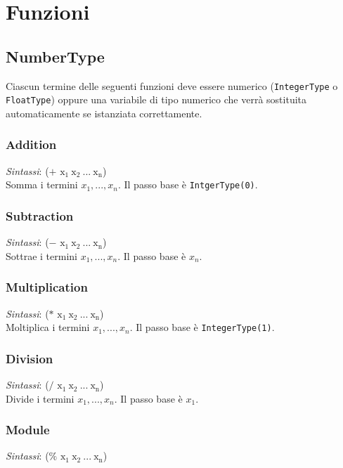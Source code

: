 \section{Funzioni}

\subsection{NumberType}

Ciascun termine delle seguenti funzioni deve essere numerico (\verb!IntegerType! o \verb!FloatType!) oppure una variabile di tipo numerico che verrà sostituita automaticamente se istanziata correttamente.

\subsubsection{Addition}
\emph{Sintassi}: ($+$ $\mathrm{x_1 \ x_2 \ ... \ x_n}$)\\

Somma i termini $x_1, ..., x_n$. Il passo base è \verb!IntgerType(0)!.


\subsubsection{Subtraction}
\emph{Sintassi}: ($-$ $\mathrm{x_1 \ x_2 \ ... \ x_n}$)\\

Sottrae i termini $x_1, ..., x_n$. Il passo base è $x_n$.


\subsubsection{Multiplication}
\emph{Sintassi}: ($*$ $ \mathrm{x_1 \ x_2 \ ... \ x_n}$)\\

Moltiplica i termini $x_1, ..., x_n$. Il passo base è \verb!IntegerType(1)!.


\subsubsection{Division}
\emph{Sintassi}: ($/$ $ \mathrm{x_1 \ x_2 \ ... \ x_n}$)\\

Divide i termini $x_1, ..., x_n$. Il passo base è $x_1$.


\subsubsection{Module}
\emph{Sintassi}: ($\%$ $ \mathrm{x_1 \ x_2 \ ... \ x_n}$)\\

